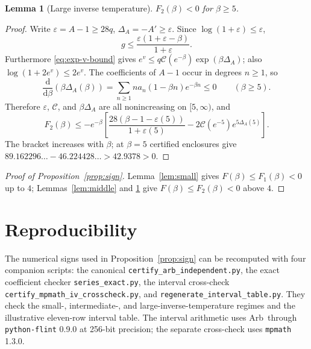 \documentclass[10pt,a4paper]{article}
\numberwithin{equation}{section}
\newtheorem{lemma}[theorem]{Lemma}\newtheorem{proposition}[theorem]{Proposition}
\theoremstyle{remark}\newtheorem{remark}[theorem]{Remark}\newtheorem{question}[theorem]{Question}
\newcommand{\dd}{\mathrm d}
\begin{document}
\begin{lemma}[Large inverse temperature]\label{lem:large}
$F_2(\beta)<0$ for $\beta\ge5$.
\end{lemma}
\begin{proof}Write $\varepsilon=A-1\ge28q$, $\Delta_A=-A'\ge\varepsilon$. Since $\log(1+\varepsilon)\le\varepsilon$,
\[
g\le\frac{\varepsilon(1+\varepsilon-\beta)}{1+\varepsilon}.
\]
Furthermore \eqref{eq:exp-v-bound} gives $e^v\le q\mathcal C(e^{-\beta})\exp(\beta\Delta_A)$; also $\log(1+2e^v)\le2e^v$. The coefficients of $A-1$ occur in degrees $n\ge1$, so
\[
\frac{\dd}{\dd\beta}(\beta\Delta_A(\beta))
=\sum_{n\ge1}na_n(1-\beta n)e^{-\beta n}\le0\qquad(\beta\ge5).
\]
Therefore $\varepsilon$, $\mathcal C$, and $\beta\Delta_A$ are all nonincreasing on $[5,\infty)$, and
\[
F_2(\beta)\le-e^{-\beta}\left[\frac{28(\beta-1-\varepsilon(5))}{1+\varepsilon(5)}-2\mathcal C(e^{-5})e^{5\Delta_A(5)}\right].
\]
The bracket increases with $\beta$; at $\beta=5$ certified enclosures give $89.162296\ldots-46.224428\ldots>42.9378>0$.\end{proof}
\begin{proof}[Proof of Proposition~\ref{prop:sign}]
Lemma~\ref{lem:small} gives $F(\beta)\le F_1(\beta)<0$ up to $4$; Lemmas~\ref{lem:middle} and \ref{lem:large} give $F(\beta)\le F_2(\beta)<0$ above $4$.\end{proof}

\section{Reproducibility}\label{app:cert}
The numerical signs used in Proposition~\ref{prop:sign} can be
recomputed with four companion scripts: the canonical
\texttt{certify\_arb\_independent.py}, the exact coefficient checker
\texttt{series\_exact.py}, the interval cross-check
\texttt{certify\_mpmath\_iv\_crosscheck.py}, and
\texttt{regenerate\_interval\_table.py}. They check the small-,
intermediate-, and large-inverse-temperature regimes and the
illustrative eleven-row interval table. The interval arithmetic uses
Arb\,\cite{johansson} through \texttt{python-flint} 0.9.0 at 256-bit
precision; the separate cross-check uses \texttt{mpmath} 1.3.0.
\end{document}
